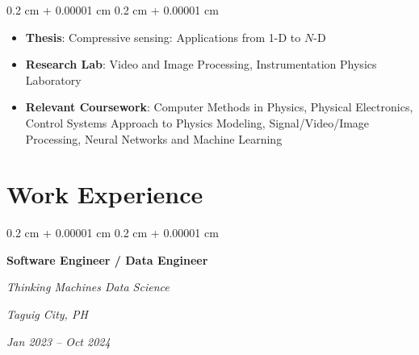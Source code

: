 \documentclass[10pt, a4paper]{article}
\newenvironment{highlights}{
    \begin{itemize}[
        topsep=0.10 cm,
        parsep=0.10 cm,
        partopsep=0pt,
        itemsep=0pt,
        leftmargin=0.4 cm + 10pt
    ]
}{
    \end{itemize}
} %
\newenvironment{onecolentry}{
    \begin{adjustwidth}{
        0.2 cm + 0.00001 cm
    }{
        0.2 cm + 0.00001 cm
    }
}{
    \end{adjustwidth}
} %
\newenvironment{twocolentry}[2][]{
    \onecolentry
    \def\secondColumn{#2}
    \setcolumnwidth{\fill, 4.5 cm}
    \begin{paracol}{2}
}{
    \switchcolumn \raggedleft \secondColumn
    \end{paracol}
    \endonecolentry
} %
\begin{document}
        \vspace{0.10 cm}
        \begin{onecolentry}
            \begin{highlights}
                \item \textbf{Thesis}: Compressive sensing: Applications from 1-D to $N$-D
                \item \textbf{Research Lab}: Video and Image Processing, Instrumentation Physics Laboratory
                \item \textbf{Relevant Coursework}: Computer Methods in Physics, Physical Electronics,  Control Systems Approach to Physics Modeling, Signal/Video/Image Processing, Neural Networks and Machine Learning

            \end{highlights}
        \end{onecolentry}



    
    \section{Work Experience}



        
        \begin{twocolentry}{
        \textit{Taguig City, PH}    
            
        \textit{Jan 2023 – Oct 2024}}
            \textbf{Software Engineer / Data Engineer}
            
            \textit{Thinking Machines Data Science}
        \end{twocolentry}
\end{document}
